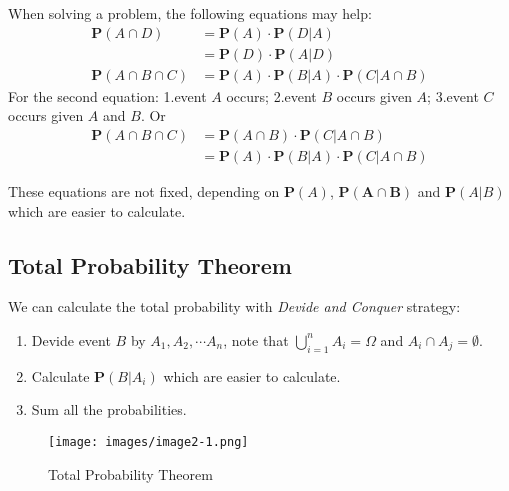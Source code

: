 When solving a problem, the following equations may help:
\begin{align}
    \mathbf{P}(A \cap D) &= \mathbf{P}(A) \cdot \mathbf{P}(D|A) \\
    &= \mathbf{P}(D) \cdot \mathbf{P}(A|D) \\
    \mathbf{P}(A \cap B \cap C) &= \mathbf{P}(A) \cdot \mathbf{P}(B|A) \cdot \mathbf{P}(C|A \cap B)
\end{align}
For the second equation: 1.event $A$ occurs; 2.event $B$ occurs given $A$; 3.event $C$ occurs given $A$ and $B$. Or
\begin{align*}
    \mathbf{P}(A \cap B \cap C) &= \mathbf{P}(A \cap B) \cdot \mathbf{P}(C | A \cap B) \\ 
    &= \mathbf{P}(A) \cdot \mathbf{P}(B | A) \cdot \mathbf{P}(C | A \cap B)
\end{align*}
\begin{remark}
    These equations are not fixed, depending on $\mathbf{P}(A)$, $\mathbf{P(A \cap B)}$ and $\mathbf{P}(A | B)$ which are easier to calculate.
\end{remark}

\subsection{Total Probability Theorem}
We can calculate the total probability with \textit{Devide and Conquer} strategy:
\begin{enumerate}
    \item Devide event $B$ by $A_1, A_2, \cdots A_n$, note that $\bigcup_{i=1}^n A_i = \Omega$ and $A_i \cap A_j = \emptyset$.
    \item Calculate $\mathbf{P}(B | A_i)$ which are easier to calculate.
    \item Sum all the probabilities.
\end{enumerate}
\begin{figure}[H]
    \centering
    \texttt{[image: images/image2-1.png]}
    \caption{Total Probability Theorem}
    \label{fig:total-probability}
\end{figure}

